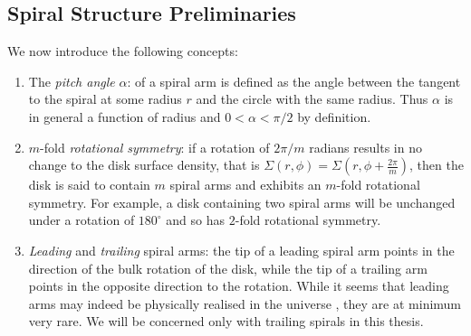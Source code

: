 \subsection{Spiral Structure Preliminaries}
We now introduce the following concepts:
\begin{enumerate}
    \item The \textit{pitch angle} $\alpha$: of a spiral arm is defined as the angle between the tangent to the spiral at some radius $r$ and the circle with the same radius. 
    Thus $\alpha$ is in general a function of radius and $0 < \alpha < \pi/2$ by definition.
    \item $m$-fold \textit{rotational symmetry}: if a rotation of $2\pi/m$ radians results in no change to the disk surface density, that is $\Sigma(r,\phi)=\Sigma(r,\phi+\frac{2\pi}{m})$, then the disk is said to contain $m$ spiral arms and exhibits an $m$-fold rotational symmetry. 
    For example, a disk containing two spiral arms will be unchanged under a rotation of $180^\circ$ and so has $2$-fold rotational symmetry.
    \item \textit{Leading} and \textit{trailing} spiral arms: the tip of a leading spiral arm points in the direction of the bulk rotation of the disk, while the tip of a trailing arm points in the opposite direction to the rotation. 
    While it seems that leading arms may indeed be physically realised in the universe \citep[eg.][]{vaisanen2008}, they are at minimum very rare. 
    We will be concerned only with trailing spirals in this thesis.
\end{enumerate}

